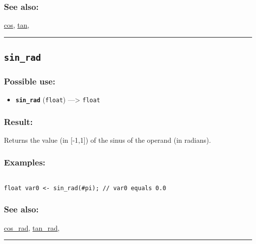 \documentclass[]{book}
\providecommand{\tightlist}{%
  \setlength{\itemsep}{0pt}\setlength{\parskip}{0pt}}
\theoremstyle{definition}
\theoremstyle{definition}
\theoremstyle{definition}
\theoremstyle{remark}
\begin{document}
\subsubsection{See also:}\label{see-also-185}

\href{OperatorsBC\#cos}{cos}, \href{OperatorsSZ\#tan}{tan},

\begin{center}\rule{0.5\linewidth}{\linethickness}\end{center}

\subsection{\texorpdfstring{\texttt{sin\_rad}}{sin\_rad}}\label{sin_rad}

\subsubsection{Possible use:}\label{possible-use-477}

\begin{itemize}
\tightlist
\item
  \textbf{\texttt{sin\_rad}} (\texttt{float}) ---\textgreater{}
  \texttt{float}
\end{itemize}

\subsubsection{Result:}\label{result-461}

Returns the value (in {[}-1,1{]}) of the sinus of the operand (in
radians).

\subsubsection{Examples:}\label{examples-333}

\begin{verbatim}
 
float var0 <- sin_rad(#pi); // var0 equals 0.0
\end{verbatim}

\subsubsection{See also:}\label{see-also-186}

\href{OperatorsBC\#cos_rad}{cos\_rad},
\href{OperatorsSZ\#tan_rad}{tan\_rad},

\begin{center}\rule{0.5\linewidth}{\linethickness}\end{center}
\end{document}
